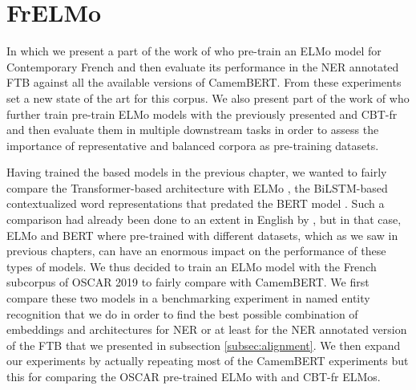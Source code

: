 \chapter{FrELMo}

\begin{center}
    \begin{minipage}{0.66\textwidth}
        \begin{small}
            In which we present a part of the work of \citet{ortiz-suarez-etal-2020-establishing} who pre-train an ELMo model for Contemporary French and then evaluate its performance in the NER annotated FTB against all the available versions of CamemBERT. From these experiments \citet{ortiz-suarez-etal-2020-establishing} set a new state of the art for this corpus. We also present part of the work of \citet{popa-fabre-etal-2020-french} who further train pre-train ELMo models with the previously presented \Cabernet and CBT-fr and then evaluate them in multiple downstream tasks in order to assess the importance of representative and balanced corpora as pre-training datasets.\footnotemark
        \end{small}
    \end{minipage}
    \vspace{0.5cm}
\end{center}


Having trained the \roberta \citep{liu-etal-2019-roberta} based \camembert \citep{martin-etal-2020-camembert} models in the previous chapter, we wanted to fairly compare the Transformer-based architecture with ELMo \citep{peters-etal-2018-deep}, the BiLSTM-based contextualized word representations that predated the BERT model \citep{devlin-etal-2019-bert}. Such a comparison had already been done to an extent in English by \citet{peters-etal-2019-tune}, but in that case, ELMo and BERT where pre-trained with different datasets, which as we saw in previous chapters, can have an enormous impact on the performance of these types of models. We thus decided to train an ELMo model with the French subcorpus of OSCAR 2019 to fairly compare with CamemBERT. We first compare these two models in a benchmarking experiment in named entity recognition that we do in order to find the best possible combination of embeddings and architectures for NER or at least for the NER annotated version of the FTB that we presented in subsection \ref{subsec:alignment}. We then expand our experiments by actually repeating most of the CamemBERT experiments but this for comparing the OSCAR pre-trained ELMo with \Cabernet and CBT-fr ELMos.

